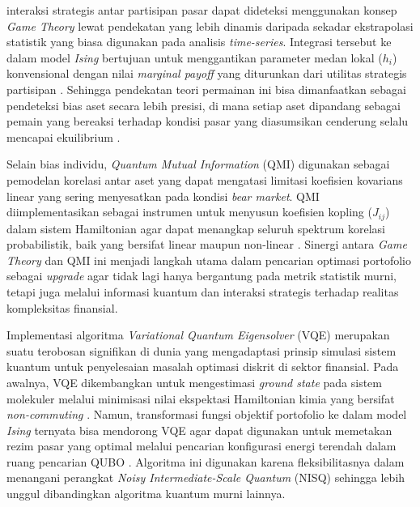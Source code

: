 interaksi strategis antar partisipan pasar dapat dideteksi menggunakan konsep \textit{Game Theory} lewat pendekatan yang lebih dinamis daripada sekadar ekstrapolasi statistik yang biasa digunakan pada analisis \textit{time-series}. Integrasi tersebut ke dalam model \textit{Ising} bertujuan untuk menggantikan parameter medan lokal ($h_i$) konvensional dengan nilai \textit{marginal payoff} yang diturunkan dari utilitas strategis partisipan \cite{la_torre_multi-agent_2026}. Sehingga pendekatan teori permainan ini bisa dimanfaatkan sebagai pendeteksi bias aset secara lebih presisi, di mana setiap aset dipandang sebagai pemain yang bereaksi terhadap kondisi pasar yang diasumsikan cenderung selalu mencapai ekuilibrium \cite{sikalo_efficient_2022}. 

Selain bias individu, \textit{Quantum Mutual Information} (QMI) digunakan sebagai pemodelan korelasi antar aset yang dapat mengatasi limitasi koefisien kovarians linear yang sering menyesatkan pada kondisi \textit{bear market}. QMI diimplementasikan sebagai instrumen untuk menyusun koefisien kopling ($J_{ij}$) dalam sistem Hamiltonian agar dapat menangkap seluruh spektrum korelasi probabilistik, baik yang bersifat linear maupun non-linear \cite{wang_achieving_2025}. Sinergi antara \textit{Game Theory} dan QMI ini menjadi langkah utama dalam pencarian optimasi portofolio sebagai \textit{upgrade} agar tidak lagi hanya bergantung pada metrik statistik murni, tetapi juga melalui informasi kuantum dan interaksi strategis terhadap realitas kompleksitas finansial.

Implementasi algoritma \textit{Variational Quantum Eigensolver} (VQE) merupakan suatu terobosan signifikan di dunia yang mengadaptasi prinsip simulasi sistem kuantum untuk penyelesaian masalah optimasi diskrit di sektor finansial. Pada awalnya, VQE dikembangkan untuk mengestimasi \textit{ground state} pada sistem molekuler melalui minimisasi nilai ekspektasi Hamiltonian kimia yang bersifat \textit{non-commuting} \cite{fedorov_vqe_2022}. Namun, transformasi fungsi objektif portofolio ke dalam model \textit{Ising} ternyata bisa mendorong VQE agar dapat digunakan untuk memetakan rezim pasar yang optimal melalui pencarian konfigurasi energi terendah dalam ruang pencarian QUBO \cite{wang_achieving_2025}. Algoritma ini digunakan karena fleksibilitasnya dalam menangani perangkat \textit{Noisy Intermediate-Scale Quantum} (NISQ) sehingga lebih unggul dibandingkan algoritma kuantum murni lainnya\cite{wang_achieving_2025}.

